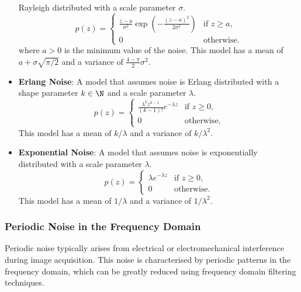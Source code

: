 \documentclass{article}
\begin{document}
\begin{itemize}
          Rayleigh distributed with a scale parameter \(\sigma\).
          \begin{equation*}
              p\left( z \right) =
              \begin{cases}
                  \displaystyle \frac{z - a}{\sigma^2} \exp\left( -\frac{\left( z - a \right)^2}{2\sigma^2} \right) & \text{if } z \geq a, \\
                  0                                                                                                 & \text{otherwise}.
              \end{cases}
          \end{equation*}
          where \(a > 0\) is the minimum value of the noise. This model
          has a mean of \(a + \sigma \sqrt{\pi/2}\) and a variance of
          \(\displaystyle \frac{4 - \pi}{2} \sigma^2\).
    \item \textbf{Erlang Noise}: A model that assumes noise is Erlang
          distributed with a shape parameter \(k \in \N\) and a scale
          parameter \(\lambda\).
          \begin{equation*}
              p\left( z \right) =
              \begin{cases}
                  \displaystyle \frac{\lambda^k z^{k-1}}{\left( k - 1 \right)!} e^{- \lambda z} & \text{if } z \geq 0, \\
                  0                                                                             & \text{otherwise},
              \end{cases}
          \end{equation*}
          This model has a mean of \(k/\lambda\) and a variance of
          \(k/\lambda^2\).
    \item \textbf{Exponential Noise}: A model that assumes noise is
          exponentially distributed with a scale parameter \(\lambda\).
          \begin{equation*}
              p\left( z \right) =
              \begin{cases}
                  \lambda e^{-\lambda z} & \text{if } z \geq 0, \\
                  0                      & \text{otherwise}.
              \end{cases}
          \end{equation*}
          This model has a mean of \(1/\lambda\) and a variance of
          \(1/\lambda^2\).
\end{itemize}
\subsubsection{Periodic Noise in the Frequency Domain}
Periodic noise typically arises from electrical or electromechanical
interference during image acquisition. This noise is characterised by
periodic patterns in the frequency domain, which can be greatly reduced
using frequency domain filtering techniques.
\end{document}
